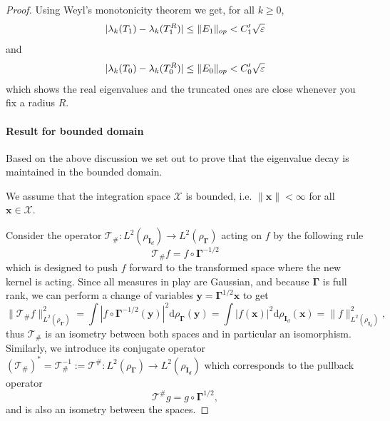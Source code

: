 \begin{proof}
    Using Weyl's monotonicity theorem we get, for all $k \geq 0$,
    \[
        |\lambda_k(T_1) - \lambda_k(T_1^R)| \leq \|E_1\|_{op} < C_1'\sqrt{\varepsilon}
    \]
    and 
    \[
        |\lambda_k(T_0) - \lambda_k(T_0^R)| \leq \|E_0\|_{op} < C_0'\sqrt{\varepsilon}
    \]
    which shows the real eigenvalues and the truncated ones are close whenever you fix a radius $R$.     
    
    \item \paragraph{Result for bounded domain}
    
    Based on the above discussion we set out to prove that the eigenvalue decay is maintained in the bounded domain. 
    
    We assume that the integration space $\mathcal X$ is bounded, i.e. $\|\bm x\| < \infty$ for all $\bm x \in \mathcal X$. 
    
    Consider the operator $\mathcal T_\#:  L^2(\rho_{\bm I_d}) \to L^2(\rho_{\bm \Gamma})$ acting on $f$ by the following rule
    \[
        \mathcal T_\# f = f \circ \bm \Gamma^{-1/2}
    \]
    which is designed to push $f$ forward to the transformed space where the new kernel is acting. Since all measures in play are Gaussian, and because $\bm \Gamma$ is full rank, we can perform a change of variables $\bm y = \bm \Gamma ^{1/2} \bm x$ to get
    \[
        \|\mathcal T_\# f\|^2_{L^2(\rho_{\bm \Gamma})} = \int |f\circ \bm \Gamma^{-1/2}(\bm y)|^2 \mathrm d\rho_{\bm \Gamma}(\bm y) = \int |f(\bm x)|^2 \mathrm d\rho_{\bm I_d}(\bm x) = \|f\|^2_{L^2(\rho_{\bm I_d})},
    \]
    thus $\mathcal T_\#$ is an isometry between both spaces and in particular an isomorphism. Similarly, we introduce its conjugate operator $(\mathcal T_\#)^* = \mathcal T_\#^{-1} := \mathcal{T^\#} : L^2(\rho_{\bm \Gamma}) \to L^2(\rho_{\bm I_d})$ which corresponds to the pullback operator
    \[
        \mathcal T^\# g = g\circ \bm \Gamma^{1/2},
    \]
    and is also an isometry between the spaces.
    

\end{proof}
